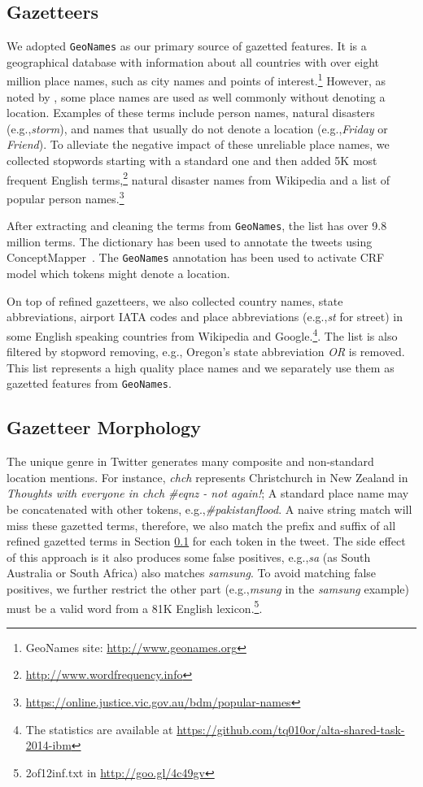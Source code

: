 \documentclass[11pt]{article}
\newcommand{\eg}{e.g.,\xspace}
\newcommand{\geoname}{\texttt{GeoNames}\xspace}
\newcommand{\myex}[1]{\textit{#1}}
\newcommand{\myurl}[1]{{\footnotesize\url{#1}}}
\newcommand{\secref}[2][]{Section#1 \ref{#2}}
\begin{document}
\subsection{Gazetteers}
\label{sec:gaze_feature}

We adopted \geoname as our primary source of gazetted features.
It is a geographical database with information about all countries with over eight million place names, such as city names and points of interest.\footnote{GeoNames site: \myurl{http://www.geonames.org}} 
However, as noted by , some place names are used as well commonly without denoting a location.
Examples of these terms include person names, natural disasters (\eg \myex{storm}), and names that usually do not denote a location (\eg \myex{Friday} or \myex{Friend}).
To alleviate the negative impact of these unreliable place names, we collected stopwords starting with a standard one and then added 5K most frequent English terms,\footnote{\myurl{http://www.wordfrequency.info}} natural disaster names from Wikipedia and a list of popular person names.\footnote{\myurl{https://online.justice.vic.gov.au/bdm/popular-names}}

After extracting and cleaning the terms from \geoname, the list has over 9.8 million terms.
The dictionary has been used to annotate the tweets using ConceptMapper~\cite{tanenblatt2010conceptmapper}.
The \geoname annotation has been used to activate CRF model which tokens might denote a location.

On top of refined gazetteers, we also collected country names, state abbreviations, airport IATA codes and place abbreviations (\eg \myex{st} for street) in some English speaking countries from Wikipedia and Google.\footnote{The statistics are available at \myurl{https://github.com/tq010or/alta-shared-task-2014-ibm}}.
The list is also filtered by stopword removing, \eg Oregon's state abbreviation \myex{OR} is removed.
This list represents a high quality place names and we separately use them as gazetted features from \geoname.

\subsection{Gazetteer Morphology}
\label{sec:mor_feature}

The unique genre in Twitter generates many composite and non-standard location mentions.
For instance, \myex{chch} represents Christchurch in New Zealand in \myex{Thoughts with everyone in chch \#eqnz - not again!}; 
A standard place name may be concatenated with other tokens, \eg \myex{\#pakistanflood}.
A naive string match will miss these gazetted terms, therefore, we also match the prefix and suffix of all refined gazetted terms in \secref{sec:gaze_feature} for each token in the tweet.
The side effect of this approach is it also produces some false positives, \eg \myex{sa} (as South Australia or South Africa) also matches \myex{samsung}.
To avoid matching false positives, we further restrict the other part (\eg \myex{msung} in the \myex{samsung} example) must be a valid word from a 81K English lexicon.\footnote{2of12inf.txt in \myurl{http://goo.gl/4c49gv}}.
\end{document}
